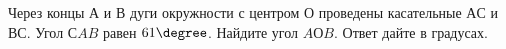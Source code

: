 \begin{ex}
	\begin{condition}
		Через концы \( А \)  и \( В \)  дуги окружности с центром \( О \)  проведены касательные \( АС \)  и \( ВС \). Угол \( СAB \)  равен \(  61\degree \). Найдите угол \( AОB \). Ответ дайте в градусах.
	\end{condition}
\end{ex}